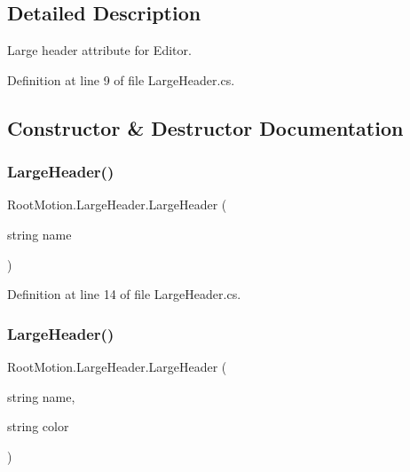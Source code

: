 \subsection{Detailed Description}
Large header attribute for Editor. 



Definition at line 9 of file Large\+Header.\+cs.



\subsection{Constructor \& Destructor Documentation}
\mbox{\label{class_root_motion_1_1_large_header_ac3fcac2a9a1f096a9205708efa60dc05}} 
\subsubsection{\texorpdfstring{Large\+Header()}{LargeHeader()}\hspace{0.1cm}{\footnotesize\ttfamily [1/2]}}
{\footnotesize\ttfamily Root\+Motion.\+Large\+Header.\+Large\+Header (\begin{DoxyParamCaption}\item[{string}]{name }\end{DoxyParamCaption})}



Definition at line 14 of file Large\+Header.\+cs.

\mbox{\label{class_root_motion_1_1_large_header_a337bf63bd9e31bdadcde4b46e566799b}} 
\subsubsection{\texorpdfstring{Large\+Header()}{LargeHeader()}\hspace{0.1cm}{\footnotesize\ttfamily [2/2]}}
{\footnotesize\ttfamily Root\+Motion.\+Large\+Header.\+Large\+Header (\begin{DoxyParamCaption}\item[{string}]{name,  }\item[{string}]{color }\end{DoxyParamCaption})}



